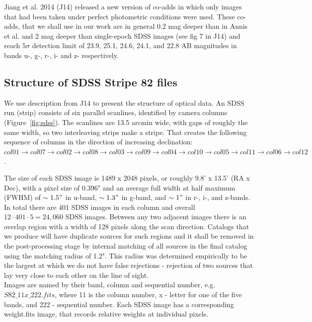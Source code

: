 Jiang et al. 2014 (J14) \citep{Jiang2014} released a new version of co-adds in which only images that had been taken under perfect photometric conditions were used. These co-adds, that we shall use in our work are in general 0.2 mag deeper than in Annis et al. and 2 mag deeper than single-epoch SDSS images (see fig 7 in J14) and reach $5\sigma$ detection limit of 23.9, 25.1, 24.6, 24.1, and 22.8 AB magnitudes in bands u-, g-, r-, i- and z- respectively. 

\subsection{Structure of SDSS Stripe 82 files}

	We use description from J14 to present the structure of optical data. An SDSS run (strip) consists of six parallel scanlines, identified by camera columns (Figure~\ref{fig:sdss}). The scanlines are 13.5 arcmin wide, with gaps of roughly the same width, so two interleaving strips make a stripe. That creates the following sequence of columns in the direction of increasing declination:
$col01 \rightarrow col07 \rightarrow col02 \rightarrow col08 \rightarrow col03 \rightarrow col09 \rightarrow col04 \rightarrow col10 \rightarrow col05 \rightarrow col11 \rightarrow col06 \rightarrow col12$.


The size of each SDSS image is 1489 x 2048 pixels, or roughly 9.8' x 13.5' (RA x Dec), with a pixel size of 0.396" and an average full width at half maximum (FWHM) of $\sim1.5"$ in u-band, $\sim1.3"$ in g-band, and $\sim1"$ in r-, i-, and z-bands. In total there are 401 SDSS images in each column and overall $12 \cdot 401 \cdot 5 = 24,060$ SDSS images. Between any two adjacent images there is an overlap region with a width of 128 pixels along the scan direction. Catalogs that we produce will have duplicate sources for such regions and it shall be removed in the post-processing stage by internal matching of all sources in the final catalog using the matching radius of 1.2". This radius was determined empirically to be the largest at which we do not have false rejections - rejection of two sources that lay very close to each other on the line of sight.\\ 
Images are named by their band, column and sequential number, e.g. $S82\_11x\_222.fits$, where 11 is the column number, x - letter for one of the five bands, and 222 - sequential number. Each SDSS image has a corresponding weight.fits image, that records relative weights at individual pixels.

